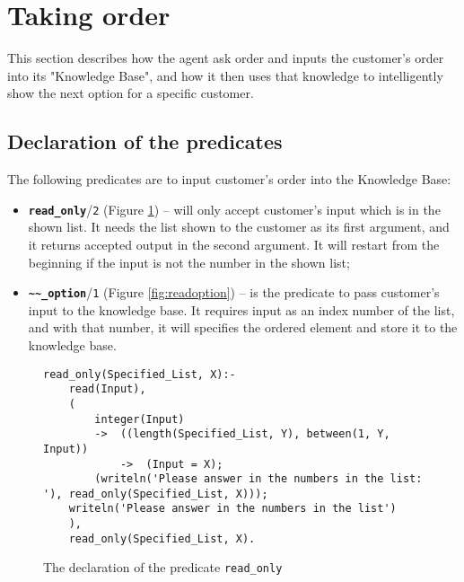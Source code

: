 \documentclass[12pt,a4paper]{article}
\newcommand{\varname}[1]{\texttt{#1}}
\newcommand{\varnamebf}[1]{\textbf{\texttt{#1}}}
\newcommand{\predprot}[2]{{\color{MidnightBlue}\varnamebf{#1}}/{\color{Mulberry}\varname{#2}}}
\newcommand{\predname}[1]{{\color{MidnightBlue}\varname{#1}}}
\begin{document}
\section{Taking order}
\label{sec:order}

This section describes how the agent ask order and inputs the customer's order into its "Knowledge Base", and how it then uses that knowledge to intelligently show the next option for a specific customer.

\subsection{Declaration of the predicates}

The following predicates are to input customer's order into the Knowledge Base:
\begin{itemize}
    \item \predprot{read\_only}{2} (Figure \ref{fig:readonly}) -- will only accept customer's input which is in the shown list. It needs the list shown to the customer as its first argument, and it returns accepted output in the second argument. It will restart from the beginning if the input is not the number in the shown list;
    
    \item \predprot{\~{}\~{}\_option}{1} (Figure \ref{fig:readoption}) -- is the predicate to pass customer's input to the knowledge base. It requires input as an index number of the list, and with that number, it will specifies the ordered element and store it to the knowledge base.
\end{itemize}

\begin{figure}[H]
	\centering
\begin{lstlisting}[style=Prolog-pygsty]
% Define read_only
read_only(Specified_List, X):- 
    read(Input),
    (
        integer(Input)
        ->  ((length(Specified_List, Y), between(1, Y, Input))
            ->  (Input = X);
        (writeln('Please answer in the numbers in the list: '), read_only(Specified_List, X)));
    writeln('Please answer in the numbers in the list')
    ),
    read_only(Specified_List, X).
\end{lstlisting}
	\caption{The declaration of the predicate \predname{read\_only}} 
	\label{fig:readonly}
\end{figure}
\end{document}
